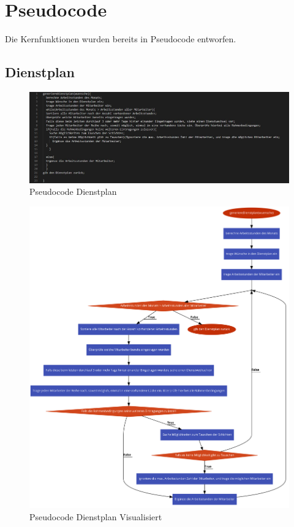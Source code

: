 \documentclass[11pt,
paper=a4,
bibtotocnumbered,	  %
liststotocnumbered,  %
DIV=calc,		  %
tablecaptionabove,	  %
headinclude,
]{article}
\begin{document}
\section{Pseudocode}
Die Kernfunktionen wurden bereits in Pseudocode entworfen.
\subsection{Dienstplan}
\begin{figure}[H]
\includegraphics[width=1\textwidth]{Bilder/pseudoD.jpg}
\caption{Pseudocode Dienstplan}
\end{figure}
\begin{figure}[H]
\includegraphics[width=1\textwidth]{Bilder/DienstplanPseudo.png}
\caption{Pseudocode Dienstplan Visualisiert}
\end{figure}
\end{document}
